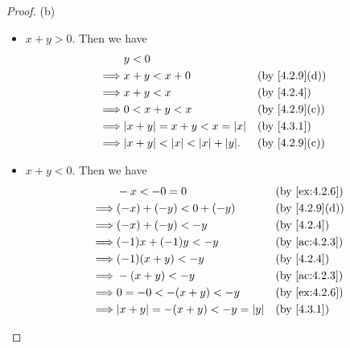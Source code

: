 \begin{proof}{(b)}
\begin{itemize}
\begin{itemize}
\begin{itemize}
                    \item \(x + y > 0\).
                          Then we have
                          \begin{align*}
                                     & y < 0                                                                       \\
                            \implies & x + y < x + 0                              &  & \text{(by \cref{4.2.9}(d))} \\
                            \implies & x + y < x                                  &  & \text{(by \cref{4.2.4})}    \\
                            \implies & 0 < x + y < x                              &  & \text{(by \cref{4.2.9}(c))} \\
                            \implies & \abs{x + y} = x + y < x = \abs{x}          &  & \text{(by \cref{4.3.1})}    \\
                            \implies & \abs{x + y} < \abs{x} < \abs{x} + \abs{y}. &  & \text{(by \cref{4.2.9}(c))}
                          \end{align*}
                    \item \(x + y < 0\).
                          Then we have
                          \begin{align*}
                                     & -x < -0 = 0                                &  & \text{(by \cref{ex:4.2.6})} \\
                            \implies & (-x) + (-y) < 0 + (-y)                     &  & \text{(by \cref{4.2.9}(d))} \\
                            \implies & (-x) + (-y) < -y                           &  & \text{(by \cref{4.2.4})}    \\
                            \implies & (-1)x + (-1)y < -y                         &  & \text{(by \cref{ac:4.2.3})} \\
                            \implies & (-1)(x + y) < -y                           &  & \text{(by \cref{4.2.4})}    \\
                            \implies & -(x + y) < -y                              &  & \text{(by \cref{ac:4.2.3})} \\
                            \implies & 0 = -0 < -(x + y) < -y                     &  & \text{(by \cref{ex:4.2.6})} \\
                            \implies & \abs{x + y} = -(x + y) < -y = \abs{y}      &  & \text{(by \cref{4.3.1})}    \\

\end{align*}
\end{itemize}
\end{itemize}
\end{itemize}
\end{proof}
